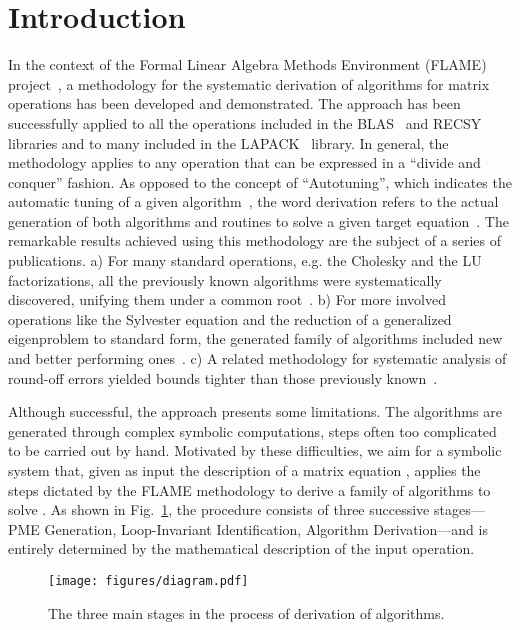 \documentclass{llncs}
\begin{document}
\section{Introduction}

In the context of the Formal Linear Algebra Methods Environment
(FLAME) project~\cite{FLAMEOnline}, a methodology for the systematic
derivation of algorithms for matrix operations has been developed and
demonstrated. 
The approach has been successfully applied to all the 
operations included in the BLAS~\cite{level3BLAS} and 
RECSY~\cite{RECSY1,RECSY2} libraries and to
many included in the LAPACK~\cite{laug} library.
In general, the methodology
applies to any operation that can be expressed in a ``divide and
conquer'' fashion.
As opposed to the concept of ``Autotuning'', which
indicates the automatic tuning of a given
algorithm~\cite{atlas-sc98,FFTW05,Pueschel:05}, the word derivation refers to the
actual generation of both algorithms and routines to solve a given
target equation~\cite{Bientinesi:2005:SDD}.
The remarkable results achieved using this methodology are the 
subject of a series of publications. 
a) For many standard operations, e.g. the Cholesky and
the LU factorizations, all the previously known algorithms were systematically 
discovered, unifying them under a common root~\cite{FLAWN11}. 
b) For more involved operations like the Sylvester
equation and the reduction of a generalized eigenproblem to standard form,
the generated family of algorithms included new and better performing 
ones~\cite{Quintana-Orti:2003:FDA,FLAWN56}.
c) A related methodology for systematic analysis of round-off errors yielded bounds tighter than
those previously known~\cite{Paolo-MASA}.

Although successful, the approach presents some limitations. The
algorithms are generated through complex symbolic computations, steps
often too complicated to be carried out by hand. Motivated by these
difficulties, we aim for a symbolic system that, given as input the
description of a matrix equation , applies the steps dictated by
the FLAME methodology to derive a family of algorithms to solve .
As shown in Fig.~\ref{fig:steps}, the procedure
consists of three successive stages---PME Generation, Loop-Invariant Identification, Algorithm Derivation---and is entirely determined by the mathematical description of the input operation.

\begin{figure}
\centering
    \texttt{[image: figures/diagram.pdf]}
    \caption{The three main stages in the process of derivation of algorithms.} \label{fig:steps}
\end{figure}
\end{document}
